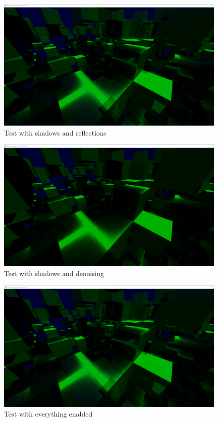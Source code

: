 \documentclass[times, utf8, zavrsni, numeric]{fer}
\begin{document}
\begin{center}
\begin{figure}[H]
\includegraphics[width=1\textwidth]{tests/shadows+reflections.png}
\caption{Test with shadows and reflections}
\end{figure}
\end{center}

\begin{center}
\begin{figure}[H]
\includegraphics[width=1\textwidth]{tests/shadows+denoising.png}
\caption{Test with shadows and denoising}
\end{figure}
\end{center}

\begin{center}
\begin{figure}[H]
\includegraphics[width=1\textwidth]{tests/all_on.png}
\caption{Test with everything enabled}
\end{figure}
\end{center}
\end{document}
